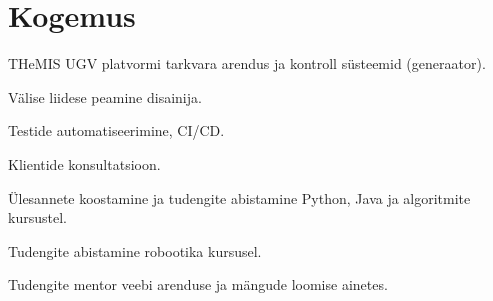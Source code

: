 \documentclass[]{deedy-resume-openfont}
\begin{document}
\begin{minipage}[t]{0.66\textwidth} %


\section{Kogemus}


\vspace{\topsep} %
\begin{tightitemize}
  \item THeMIS UGV platvormi tarkvara arendus ja kontroll süsteemid (generaator).
  \item Välise liidese peamine disainija.
  \item Testide automatiseerimine, CI/CD.
  \item Klientide konsultatsioon.
\end{tightitemize}

\sectionspace %



\begin{tightitemize}
\item Ülesannete koostamine ja tudengite abistamine Python, Java ja algoritmite kursustel.
\item Tudengite abistamine robootika kursusel.
\item Tudengite mentor veebi arenduse ja mängude loomise ainetes.
\end{tightitemize}

\sectionspace %




\end{minipage}
\end{document}
